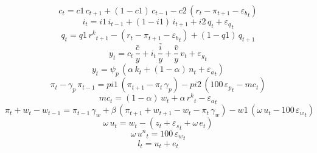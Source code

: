 \begin{dmath}
{{c}}_{t}={c1}\, {{c}}_{t+1}+\left(1-{c1}\right)\, {{c}}_{t-1}-{c2}\, \left({{r}}_{t}-{{\pi}}_{t+1}-{{\varepsilon_b}}_{t}\right)
\end{dmath}
\begin{dmath}
{{i}}_{t}={i1}\, {{i}}_{t-1}+\left(1-{i1}\right)\, {{i}}_{t+1}+{i2}\, {{q}}_{t}+{{\varepsilon_q}}_{t}
\end{dmath}
\begin{dmath}
{{q}}_{t}={q1}\, {{r^{k}}}_{t+1}-\left({{r}}_{t}-{{\pi}}_{t+1}-{{\varepsilon_b}}_{t}\right)+\left(1-{q1}\right)\, {{q}}_{t+1}
\end{dmath}
\begin{dmath}
{{y}}_{t}={{c}}_{t}\, {{\frac{\bar{c}}{y}}}+{{i}}_{t}\, {{\frac{\bar{i}}{y}}}+{{\frac{\bar{v}}{y}}}\, {{v}}_{t}+{{\varepsilon_g}}_{t}
\end{dmath}
\begin{dmath}
{{y}}_{t}={{\psi_p}}\, \left({{\alpha}}\, {{k}}_{t}+\left(1-{{\alpha}}\right)\, {{n}}_{t}+{{\varepsilon_a}}_{t}\right)
\end{dmath}
\begin{dmath}
{{\pi}}_{t}-{{\gamma_p}}\, {{\pi}}_{t-1}={pi1}\, \left({{\pi}}_{t+1}-{{\pi}}_{t}\, {{\gamma_p}}\right)-{pi2}\, \left(100\, {{\varepsilon_p}}_{t}-{{mc}}_{t}\right)
\end{dmath}
\begin{dmath}
{{mc}}_{t}=\left(1-{{\alpha}}\right)\, {{w}}_{t}+{{\alpha}}\, {{r^{k}}}_{t}-{{\varepsilon_a}}_{t}
\end{dmath}
\begin{dmath}
{{\pi}}_{t}+{{w}}_{t}-{{w}}_{t-1}={{\pi}}_{t-1}\, {{\gamma_w}}+{{\beta}}\, \left({{\pi}}_{t+1}+{{w}}_{t+1}-{{w}}_{t}-{{\pi}}_{t}\, {{\gamma_w}}\right)-{w1}\, \left({{\omega}}\, {{u}}_{t}-100\, {{\varepsilon_w}}_{t}\right)
\end{dmath}
\begin{dmath}
{{\omega}}\, {{u}}_{t}={{w}}_{t}-\left({{z}}_{t}+{{\varepsilon_s}}_{t}+{{\omega}}\, {{e}}_{t}\right)
\end{dmath}
\begin{dmath}
{{\omega}}\, {{u^{n}}}_{t}=100\, {{\varepsilon_w}}_{t}
\end{dmath}
\begin{dmath}
{{l}}_{t}={{u}}_{t}+{{e}}_{t}
\end{dmath}
